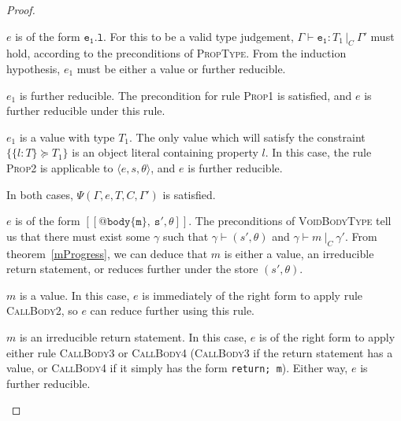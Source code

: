 \documentclass[12pt,a4paper,twoside,openright]{report}
\theoremstyle{definition}
\theoremstyle{dotless}
\newcommand{\typed}[2]{\Gamma{}\vdash\mathtt{#1}: #2\,|_C\:\Gamma'}
\newcommand{\indHypTwo}{\Psi(\Gamma, e, T, C, \Gamma')}
\begin{document}
\begin{proof}
\begin{case}[IdType]
  \end{case}

  \begin{case}[PropType]\label{proptype}

	$e$ is of the form $\mathtt{e_1.l}$. For this to be a valid type
	judgement, $\typed{e_1}{T_1}$ must hold, according to the preconditions of
	\textsc{PropType}. From the induction hypothesis, $e_1$ must be either a
	value or further reducible.
	\begin{subcase}
	  $e_1$ is further reducible.
	  The precondition for rule \textsc{Prop1} is
	  satisfied, and $e$ is further reducible under this rule.
  	\end{subcase}
  	\begin{subcase}
  	  $e_1$ is a value with type $T_1$.
  	  The only value which will satisfy the constraint $\{\{l:T\}\succeq T_1\}$
	  is an object literal containing property $l$. In this case, the rule
	  \textsc{Prop2} is applicable to $\langle e, s, \theta\rangle$, and $e$ is
	  further reducible.
  	\end{subcase}
	In both cases, $\indHypTwo$ is satisfied.

  \end{case}

  	\begin{case}[VoidBodyType]\label{bodytype}

	  $e$ is of the form $\mathtt{[\![@body\{m\},\ s', \theta]\!]}$. The
	  preconditions of \textsc{VoidBodyType} tell us that there must exist some
	  $\gamma$ such that $\gamma \vdash(s', \theta)$ and $\gamma\vdash m\ |_C\
	  \gamma'$. From theorem~\ref{mProgress}, we can deduce that $m$ is either
	  a value, an irreducible return statement, or reduces further under the store $(s',
	  \theta)$.

	  \begin{subcase}
	  	$m$ is a value.
	  	In this case, $e$ is immediately of the right form to apply rule
	  	\textsc{CallBody2}, so $e$ can reduce further using this rule.
	  \end{subcase}

	  \begin{subcase}
	  	$m$ is an irreducible return statement.
	  	In this case, $e$ is of the right form to apply either rule \textsc{CallBody3} or
	  	\textsc{CallBody4} (\textsc{CallBody3} if the return statement has a
	  	value, or \textsc{CallBody4} if it simply has the form \texttt{return; m}).
 	  	Either way, $e$ is further reducible.
	  \end{subcase}


\end{case}
\end{proof}
\end{document}

